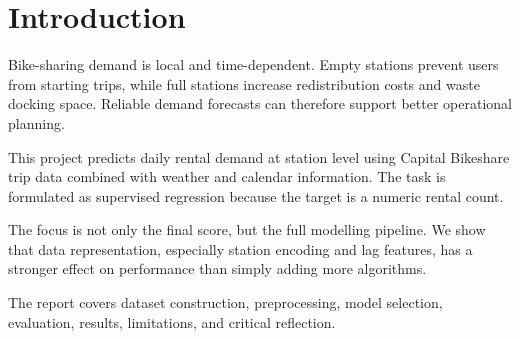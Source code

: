 \section{Introduction}

Bike-sharing demand is local and time-dependent. Empty stations prevent users from starting trips, while full stations increase redistribution costs and waste docking space. Reliable demand forecasts can therefore support better operational planning.

This project predicts daily rental demand at station level using Capital Bikeshare trip data combined with weather and calendar information. The task is formulated as supervised regression because the target is a numeric rental count.

The focus is not only the final score, but the full modelling pipeline. We show that data representation, especially station encoding and lag features, has a stronger effect on performance than simply adding more algorithms.

The report covers dataset construction, preprocessing, model selection, evaluation, results, limitations, and critical reflection.